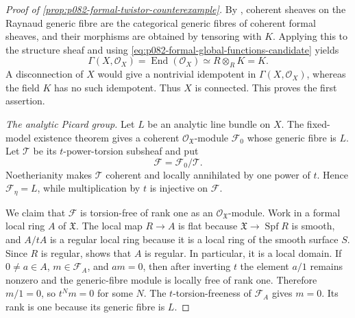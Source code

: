 \begin{proof}[Proof of
\cref{prop:p082-formal-twistor-counterexample}]
By \cite[Remark~2.2 and Proposition~2.3]{HMS11FormalFibre}, coherent
sheaves on the Raynaud generic fibre are the categorical generic fibres of
coherent formal sheaves, and their morphisms are obtained by tensoring with
$K$.  Applying this to the structure sheaf and using
\eqref{eq:p082-formal-global-functions-candidate} yields
\begin{equation}\label{eq:p082-analytic-global-functions-candidate}
             \Gamma(X,\mathcal O_X)
              =\operatorname{End}(\mathcal O_X)
              \simeq R\otimes_R K=K.
\end{equation}
A disconnection of $X$ would give a nontrivial idempotent in
$\Gamma(X,\mathcal O_X)$, whereas the field $K$ has no such idempotent.
Thus $X$ is connected.  This proves the first assertion.

\emph{The analytic Picard group.}
Let $L$ be an analytic line bundle on $X$.  The fixed-model existence
theorem \cite[Theorem~B.1.8(a)]{CLD25} gives a coherent
$\mathcal O_{\mathfrak X}$-module $\mathcal F_0$ whose generic fibre is
$L$.  Let $\mathcal T$ be its $t$-power-torsion subsheaf and put
\[
                    \mathcal F=\mathcal F_0/\mathcal T.
\]
Noetherianity makes $\mathcal T$ coherent and locally annihilated by one
power of $t$.  Hence $\mathcal F_\eta=L$, while multiplication by $t$
is injective on $\mathcal F$.

We claim that $\mathcal F$ is torsion-free of rank one as an
$\mathcal O_{\mathfrak X}$-module.  Work in a formal local ring $A$ of
$\mathfrak X$.  The local map $R\to A$ is flat because
$\mathfrak X\to\operatorname{Spf}R$ is smooth, and $A/tA$ is a regular
local ring because it is a local ring of the smooth surface $S$.
Since $R$ is regular, \cite[Tag~031E]{StacksProject} shows that $A$ is
regular.  In particular, it is a local domain.  If
$0\neq a\in A$, $m\in\mathcal F_A$, and $am=0$, then after inverting
$t$ the element $a/1$ remains nonzero and the generic-fibre module is
locally free of rank one.  Therefore $m/1=0$, so $t^N m=0$ for some
$N$.  The $t$-torsion-freeness of $\mathcal F_A$ gives $m=0$.
Its rank is one because its generic fibre is $L$.


\end{proof}

